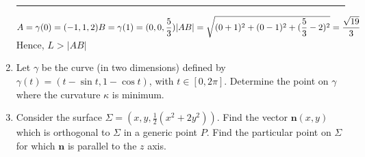 \documentclass[fleqn]{article}
\begin{document}
\begin{enumerate}
      \textcolor{hwColor}{
        \rule{15cm}{1pt}
      }

      \textcolor{hwColor}{
        $
          A=\gamma(0)=(-1, 1, 2) \\
          B=\gamma(1)=(0, 0, \dfrac{5}{3}) \\
          \\
          |AB|=\sqrt{(0+1)^2+(0-1)^2+(\dfrac{5}{3}-2)^2}=\dfrac{\sqrt{19}}{3} \\
        $
        \\
        Hence, $L > |AB|$
      }

    \item Let $\gamma$ be the curve (in two dimensions) defined by $\gamma(t)=(t-\sin t, 
    1-\cos t)$, with $t\in[0,2\pi]$.  Determine the point on $\gamma$ where the curvature $\kappa$ is minimum.


    \item Consider the surface $\Sigma=(x,y, \frac{1}{2}(x^2 + 2 y^2))$. Find the vector $\mathbf{n}(x,y)$ which is orthogonal to $\Sigma$ in a generic point $P$.  Find the particular point on $\Sigma$ for which $\mathbf{n}$ is parallel to the $z$ axis. 

  \end{enumerate}
\end{document}

